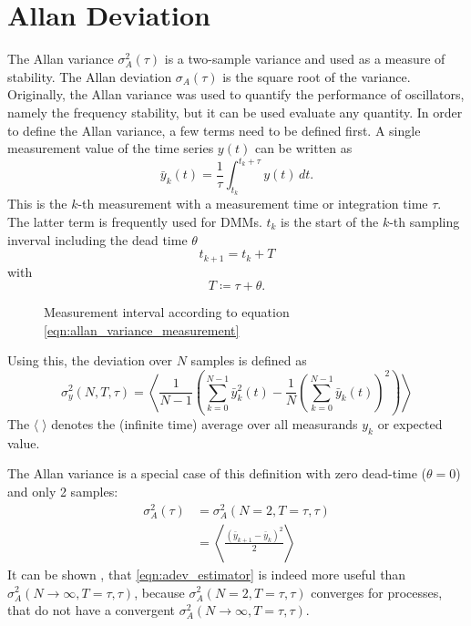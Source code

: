 \clearpage
\section{Allan Deviation}
The Allan variance \cite{adev} $\sigma_A^2(\tau)$ is a two-sample variance and used as a measure of stability. The Allan deviation $\sigma_A(\tau)$ is the square root of the variance. Originally, the Allan variance was used to quantify the performance of oscillators, namely the frequency stability, but it can be used evaluate any quantity. In order to define the Allan variance, a few terms need to be defined first. A single measurement value of the time series $y(t)$ can be written as
\begin{equation}
    \bar y_k(t) = \frac{1}{\tau} \int_{t_{k}}^{t_{k}+\tau} y(t)\,dt . \label{eqn:allan_variance_measurement}
\end{equation}
This is the $k$-th measurement with a measurement time or integration time $\tau$. The latter term is frequently used for DMMs. $t_k$ is the start of the $k$-th sampling inverval including the dead time $\theta$
\begin{equation}
    t_{k+1} = t_k + T
\end{equation}
with
\begin{equation}
    T \coloneqq \tau + \theta .
\end{equation}

\begin{figure}[hb]
    \centering
    \caption{Measurement interval according to equation \ref{eqn:allan_variance_measurement}}
    \label{fig:allan_variance_definitions}
\end{figure}

Using this, the deviation over $N$ samples is defined as \cite{adev,psd_to_adev}
\begin{equation}
    \sigma_y^2(N,T,\tau) = \left\langle \frac{1}{N-1} \left(\sum _{k=0}^{N-1}\bar y_k^2(t)-\frac{1}{N}\left(\sum _{k=0}^{N-1} \bar y_k(t)\right)^2\right)\right\rangle
\end{equation}
The $\langle \; \rangle$ denotes the (infinite time) average over all measurands $y_k$ or expected value.

The Allan variance is a special case of this definition with zero dead-time ($\theta=0$) and only 2 samples:
\begin{align}
    \sigma_A^2(\tau) &= \sigma_A^2(N=2,T=\tau,\tau) \label{eqn:allan_coefficients}\\
    &= \left\langle \frac{\left(\bar y_{k+1} - \bar y_k \right)^2}{2} \right\rangle
\end{align}
It can be shown \cite{psd_to_adev}, that \ref{eqn:adev_estimator} is indeed more useful than $\sigma_A^2(N\to\infty,T=\tau,\tau)$, because $\sigma_A^2(N=2,T=\tau,\tau)$ converges for processes, that do not have a convergent $\sigma_A^2(N\to\infty,T=\tau,\tau)$.

